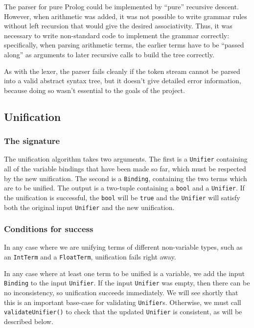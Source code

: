 \documentclass[12pt]{article}
\begin{document}
The parser for pure Prolog could be implemented by ``pure'' recursive descent. 
However, when arithmetic was added, it was not possible to write grammar rules without left recursion that would give the desired associativity. 
Thus, it was necessary to write non-standard code to implement the grammar correctly: specifically, when parsing arithmetic terms, the earlier terms have to be ``passed along'' as arguments to later recursive calls to build the tree correctly.

As with the lexer, the parser fails cleanly if the token stream cannot be parsed into a valid abstract syntax tree, but it doesn't give detailed error information, because doing so wasn't essential to the goals of the project.

\subsection{Unification}

\subsubsection{The signature}

The unification algorithm takes two arguments. 
The first is a \verb|Unifier| containing all of the variable bindings that have been made so far, which must be respected by the new unification. 
The second is a \verb|Binding|, containing the two terms which are to be unified. 
The output is a two-tuple containing a \verb|bool| and a \verb|Unifier|. 
If the unification is successful, the \verb|bool| will be \verb|true| and the \verb|Unifier| will satisfy both the original input \verb|Unifier| and the new unification.

\subsubsection{Conditions for success}

In any case where we are unifying terms of different non-variable types, such as an \verb|IntTerm| and a \verb|FloatTerm|, unification fails right away. 

In any case where at least one term to be unified is a variable, we add the input \verb|Binding| to the input \verb|Unifier|. 
If the input \verb|Unifier| was empty, then there can be no inconsistency, so unification succeeds immediately. 
We will see shortly that this is an important base-case for validating \verb|Unifier|s. 
Otherwise, we must call \verb|validateUnifier()| to check that the updated \verb|Unifier| is consistent, as will be described below.
\end{document}

